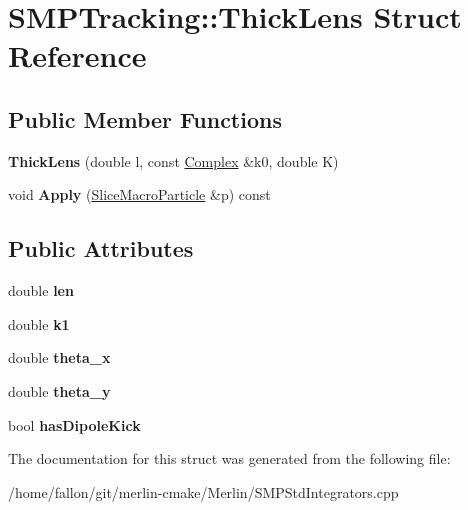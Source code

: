 \hypertarget{structSMPTracking_1_1ThickLens}{}\section{S\+M\+P\+Tracking\+:\+:Thick\+Lens Struct Reference}
\label{structSMPTracking_1_1ThickLens}
\subsection*{Public Member Functions}
\begin{DoxyCompactItemize}
\item 
\mbox{\label{structSMPTracking_1_1ThickLens_a253efeb62bde1aedde36f1c35bc6b210}} 
{\bfseries Thick\+Lens} (double l, const \hyperlink{classComplex}{Complex} \&k0, double K)
\item 
\mbox{\label{structSMPTracking_1_1ThickLens_a5ce949df9619b7c47db58fd341bca1c2}} 
void {\bfseries Apply} (\hyperlink{classSMPTracking_1_1SliceMacroParticle}{Slice\+Macro\+Particle} \&p) const
\end{DoxyCompactItemize}
\subsection*{Public Attributes}
\begin{DoxyCompactItemize}
\item 
\mbox{\label{structSMPTracking_1_1ThickLens_a9caba2429a27e126008c41932bc667ba}} 
double {\bfseries len}
\item 
\mbox{\label{structSMPTracking_1_1ThickLens_af681c0ba7736ea6813f2c2f66a75be55}} 
double {\bfseries k1}
\item 
\mbox{\label{structSMPTracking_1_1ThickLens_ae4ef744afc96ae8395070c508d43b369}} 
double {\bfseries theta\+\_\+x}
\item 
\mbox{\label{structSMPTracking_1_1ThickLens_a63a80740f7a6ede563ed6e2983759cc9}} 
double {\bfseries theta\+\_\+y}
\item 
\mbox{\label{structSMPTracking_1_1ThickLens_aab89ccdfe32be7ac6a36294924d8915f}} 
bool {\bfseries has\+Dipole\+Kick}
\end{DoxyCompactItemize}


The documentation for this struct was generated from the following file\+:\begin{DoxyCompactItemize}
\item 
/home/fallon/git/merlin-\/cmake/\+Merlin/S\+M\+P\+Std\+Integrators.\+cpp\end{DoxyCompactItemize}

